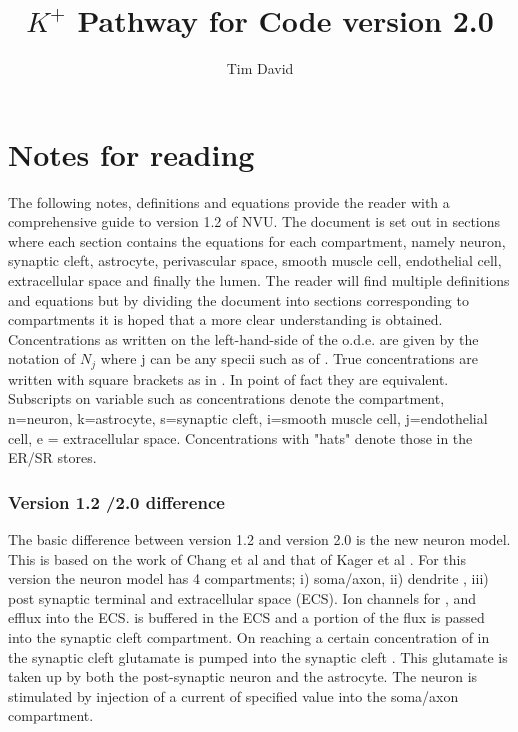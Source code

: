 \documentclass[fleqn]{report}
\numberwithin{equation}{section}
\numberwithin{equation}{section}
\newcommand{\Na}{\text{Na$^{+}$}}
\newcommand{\K}{\text{K$^+$}}
\newcommand{\Ca}{\text{Ca$^{2+}$}}
\newcommand{\Can}{\text{[Ca$^{2+}]_n$}}
\begin{document}
\author{Tim David}
\title{ $K^+ $ Pathway for Code version 2.0 }
\maketitle
\newpage
\linenumbers
\listoftodos 
%
%
%
%
%
\chapter{Notes for reading}
The following notes, definitions and equations provide the reader with a comprehensive guide to version 1.2 of NVU. The document is set out in sections where each section contains the equations for each compartment, namely neuron, synaptic cleft, astrocyte, perivascular space, smooth muscle cell, endothelial cell, extracellular space and finally the lumen. The reader will find multiple definitions and equations but by dividing the document into sections corresponding to compartments it is hoped that a more clear understanding is obtained.
Concentrations as written on the left-hand-side of the o.d.e. are given by the notation of $N_j$ where j can be any specii such as \Na of \Ca. True concentrations are written with square brackets as in \Can . In point of fact they are equivalent.
Subscripts on variable such as concentrations denote the compartment, n=neuron, k=astrocyte, s=synaptic cleft, i=smooth muscle cell, j=endothelial cell, e = extracellular space.  Concentrations with "hats" denote those in the ER/SR stores. 
\subsection{Version 1.2 /2.0 difference}
 The basic difference between version 1.2 and version 2.0 is the new neuron model. This is based on the work of Chang et al \cite{Chang2013}	and that of Kager et al \cite{Kager2000a}. For this version the neuron model has  4 compartments; i) soma/axon, ii) dendrite , iii) post synaptic terminal and extracellular space (ECS). Ion channels for \Na, and \K efflux into the ECS.  \K is buffered in the ECS and a portion of the \K flux is passed into the synaptic cleft compartment. On reaching a certain concentration of \K in the synaptic cleft  glutamate is pumped into the synaptic cleft . This glutamate is taken up by both the post-synaptic neuron and the astrocyte. The neuron is stimulated by injection of a current of specified value into the soma/axon compartment. 
 
\end{document}
